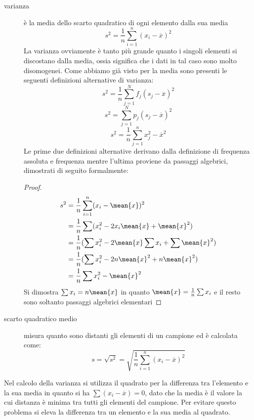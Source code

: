 \documentclass[a4paper,12pt, oneside]{book}
\begin{document}
\begin{description}
        \item [varianza] è la media dello scarto quadratico di ogni elemento dalla sua media 
                \[ s^2 = \frac{1}{n} \sum _{i = 1} ^ n (x_i - \overline{x})^2 \]
                La varianza ovviamente è tanto più grande quanto i singoli elementi si discostano dalla media, 
                ossia significa che i dati in tal caso sono molto disomogenei.\newline
                Come abbiamo già visto per la media sono presenti le seguenti definizioni alternative di varianza:
                \[ s^2 = \frac{1}{n} \sum _{j = 1} ^ N f_j (s_j - \overline{x}) ^ 2 \]
                \[ s^2 = \sum _{j = 1} ^ N p_j (s_j - \overline{x}) ^ 2 \]
                \[ s^2 = \frac{1}{n} \sum _{j = 1} ^ n x_j ^ 2 - \overline{x} ^ 2 \]
                Le prime due definizioni alternative derivano dalla definizione di frequenza assoluta e frequenza 
                mentre l'ultima proviene da passaggi algebrici, dimostrati di seguito formalmente:
                \begin{proof}
                        \[ \begin{split}
                            s^2 & = \frac{1}{n} \sum _{i = 1} ^ n (x_i - \mean{x}) ^ 2 \\
                                & = \frac{1}{n} \sum (x_i ^ 2 - 2x_i\mean{x} + \mean{x} ^ 2) \\
                                & = \frac{1}{n} (\sum x_i^2 - 2\mean{x} \sum x_i + \sum \mean{x} ^ 2) \\
                                & = \frac{1}{n} (\sum x_i^2 - 2n\mean{x}^2 + n\mean{x}^2) \\
                                & = \frac{1}{n} \sum x_i^2 - \mean{x} ^ 2 \\
                            \end{split} \]
                Si dimostra $\sum x_i = n \mean{x}$ in quanto $\mean{x} = \frac{1}{n} \sum x_i$ e il resto 
                sono soltanto passaggi algebrici elementari
                \end{proof}

    \item [scarto quadratico medio] misura quanto sono distanti gli elementi di un campione ed è calcolata come:
            \[ s = \sqrt{s^2} = \sqrt{\frac{1}{n} \sum _{i = 1} ^ n (x_i - \overline{x}) ^ 2} \]
\end{description}
Nel calcolo della varianza si utilizza il quadrato per la differenza tra l'elemento e la sua media in quanto 
si ha $\sum (x_i - \overline{x}) = 0$, dato che la media è il valore la cui distanza è minima tra tutti gli 
elementi del campione.\newline
Per evitare questo problema si eleva la differenza tra un elemento e la sua media al quadrato.
\end{document}
